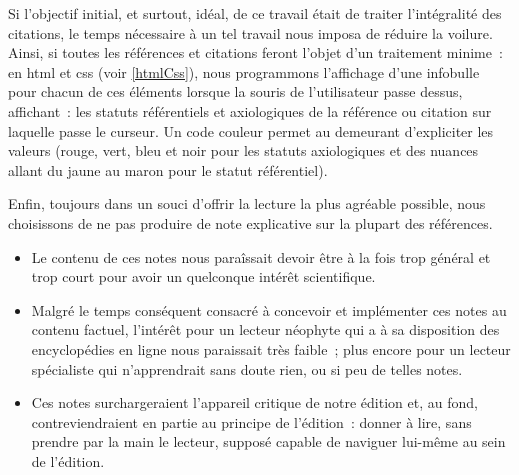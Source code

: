 \documentclass[12pt, a4paper]{article}
\begin{document}
Si l'objectif initial, et surtout, idéal, de ce travail était de traiter l'intégralité des citations, le temps nécessaire à un tel travail nous imposa de réduire la voilure.
Ainsi, si toutes les références et citations feront l'objet d'un traitement minime~: en html et css (voir \ref{htmlCss}), nous programmons l'affichage d'une infobulle pour chacun de ces éléments lorsque la souris de l'utilisateur passe dessus, affichant~: les statuts référentiels et axiologiques de la référence ou citation sur laquelle passe le curseur. Un code couleur permet au demeurant d'expliciter les valeurs (rouge, vert, bleu et noir pour les statuts axiologiques et des nuances allant du jaune au maron pour le statut référentiel).


Enfin, toujours dans un souci d'offrir la lecture la plus agréable possible, nous choisissons de ne pas produire de note explicative sur la plupart des références.
\begin{itemize}
    \item Le contenu de ces notes nous paraîssait devoir être à la fois trop général et trop court pour avoir un quelconque intérêt scientifique.
    \item Malgré le temps conséquent consacré à concevoir et implémenter ces notes au contenu factuel, l'intérêt pour un lecteur néophyte qui a à sa disposition des encyclopédies en ligne nous paraissait très faible~; plus encore pour un lecteur spécialiste qui n'apprendrait sans doute rien, ou si peu de telles notes.
    \item Ces notes surchargeraient l'appareil critique de notre édition et, au fond, contreviendraient en partie au principe de l'édition~: donner à lire, sans prendre par la main le lecteur, supposé capable de naviguer lui-même au sein de l'édition.
\end{itemize}
\end{document}
